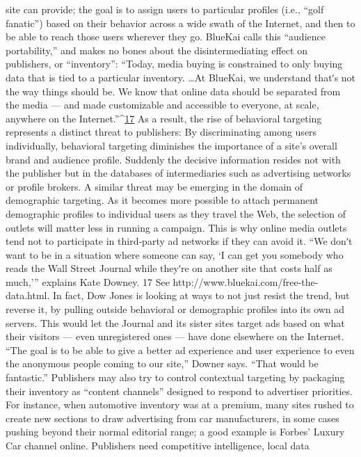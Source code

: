 site can provide; the goal is to assign users to particular profiles (i.e., ``golf
fanatic'') based on their behavior across a wide swath of the Internet, and
then to be able to reach those users wherever they go. BlueKai calls this
``audience portability,'' and makes no bones about the disintermediating
effect on publishers, or ``inventory'':
``Today, media buying is constrained to only buying data that is
tied to a particular inventory. \ldots  At BlueKai, we understand thatʹs
not the way things should be. We know that online data should be
separated from the media — and made customizable and accessible
to everyone, at scale, anywhere on the Internet.''^{\href{#endnotes}{17}}
As a result, the rise of behavioral targeting represents a distinct threat to
publishers: By discriminating among users individually, behavioral
targeting diminishes the importance of a site’s overall brand and audience
profile. Suddenly the decisive information resides not with the publisher
but in the databases of intermediaries such as advertising networks or
profile brokers. A similar threat may be emerging in the domain of
demographic targeting. As it becomes more possible to attach permanent
demographic profiles to individual users as they travel the Web, the
selection of outlets will matter less in running a campaign.
This is why online media outlets tend not to participate in third‐party ad
networks if they can avoid it. ``We donʹt want to be in a situation where
someone can say, ‘I can get you somebody who reads the Wall Street
Journal while theyʹre on another site that costs half as much,’'' explains
Kate Downey.
17 See http://www.bluekai.com/free-the-data.html.
In fact, Dow Jones is looking at ways to not just resist the trend, but
reverse it, by pulling outside behavioral or demographic profiles into its
own ad servers. This would let the Journal and its sister sites target ads
based on what their visitors — even unregistered ones — have done
elsewhere on the Internet. ``The goal is to be able to give a better ad
experience and user experience to even the anonymous people coming to
our site,'' Downer says. ``That would be fantastic.''
Publishers may also try to control contextual targeting by packaging their
inventory as ``content channels'' designed to respond to advertiser
priorities. For instance, when automotive inventory was at a premium,
many sites rushed to create new sections to draw advertising from car
manufacturers, in some cases pushing beyond their normal editorial
range; a good example is Forbes’ Luxury Car channel online.
Publishers need competitive intelligence, local data
